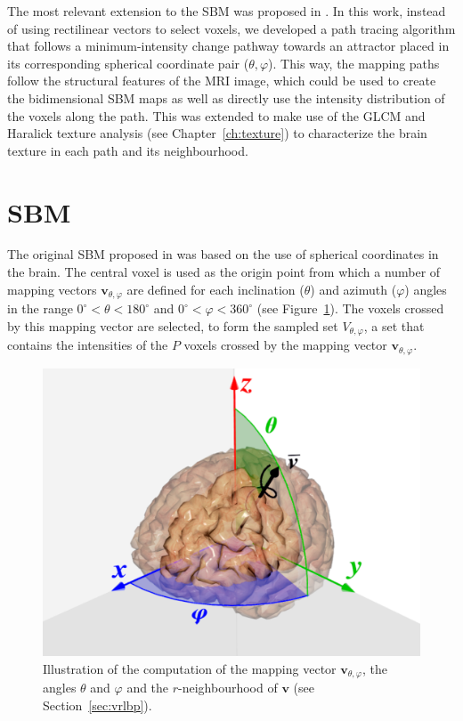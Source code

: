 The most relevant extension to the \ac{SBM} was proposed in \cite{Martinez-Murcia2016}. In this work, instead of using rectilinear vectors to select voxels, we developed a path tracing algorithm that follows a minimum-intensity change pathway towards an attractor placed in its corresponding spherical coordinate pair ($\theta,\varphi$). This way, the mapping paths follow the structural features of the \ac{MRI} image, which could be used to create the bidimensional \ac{SBM} maps as well as directly use the intensity distribution of the voxels along the path. This was extended to make use of the \ac{GLCM} and Haralick texture analysis (see Chapter~\ref{ch:texture}) to characterize the brain texture in each path and its neighbourhood. 


\section{\acf{SBM}}\label{sec:mapping}
The original \ac{SBM} proposed in \cite{Martinez-Murcia2014225,Martinez-Murcia2015} was based on the use of spherical coordinates in the brain. The central voxel is used as the origin point from which a number of mapping vectors $\mathbf{v}_{\theta,\varphi}$ are defined for each inclination ($\theta$) and azimuth ($\varphi$) angles in the range $0^{\circ}<\theta<180^{\circ}$ and $0^{\circ}<\varphi<360^{\circ}$ (see Figure~\ref{fig:brainmapping}). The voxels crossed by this mapping vector are selected, to form the sampled set $V_{\theta,\varphi}$, a set that contains the intensities of the $P$ voxels crossed by the mapping vector $\mathbf{v}_{\theta,\varphi}$.

\begin{figure}[htp]
	\myfloatalign
	\includegraphics[width=0.7\columnwidth]{Graphics/ch6/02-projection}
	\caption{Illustration of the computation of the mapping vector $\mathbf{v}_{\theta,\varphi}$, the angles $\theta$ and $\varphi$ and the $r$-neighbourhood of $\mathbf{v}$ (see Section~\ref{sec:vrlbp}).}
	\label{fig:brainmapping}
\end{figure}

